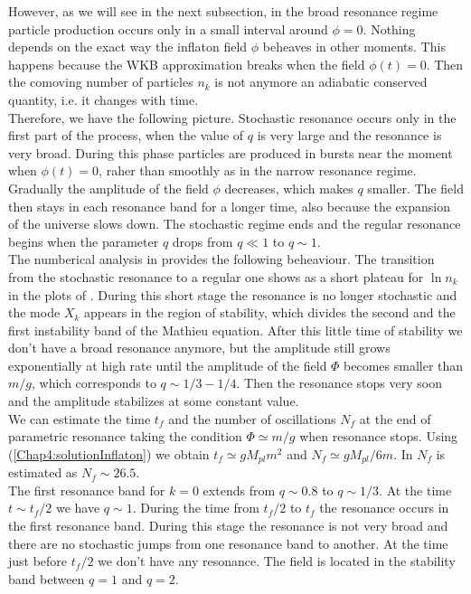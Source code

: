 \documentclass[11pt,a4paper,twoside]{book}
\begin{document}
However, as we will see in the next subsection, in the broad resonance regime particle production occurs only in a small interval around $ \phi=0 $. Nothing depends on the exact way the inflaton field $\phi$ beheaves in other moments. This happens because the WKB approximation breaks when the field $ \phi(t)=0 $. Then the comoving number of particles $ n_{k} $  is not anymore an adiabatic conserved quantity, i.e. it changes with time. \\
Therefore, we have the following picture. Stochastic resonance occurs only in the first part of the process, when the value of  $ q $ is very large and the resonance is very broad.  During this phase particles are produced in bursts near the moment when $ \phi(t)=0 $, raher than smoothly as in the narrow resonance regime. Gradually the amplitude of the field $\phi$ decreases, which makes $ q $ smaller. The field then stays in each resonance band for a longer time, also because the expansion of the universe slows down. The stochastic regime ends and the regular resonance begins when the parameter $ q $ drops from $ q \ll 1 $ to $ q \sim 1 $.\\
 The numberical analysis in \cite{Chap4:LindePreheatingModel} provides the following beheaviour. The transition from the stochastic resonance to a regular one shows as a  short plateau for $ \ln n_{k} $ in the plots of \cite{Chap4:LindePreheatingModel}. During this short stage the resonance is no longer stochastic and the mode $ X_{k} $ appears in the region of stability, which divides the second and the first instability band of the Mathieu equation. After this little time of stability we don't have a broad resonance anymore, but the amplitude still grows exponentially at high rate until the amplitude of the field $ \Phi $ becomes smaller than $ m/g $, which corresponds to $ q \sim 1/3-1/4 $. Then the resonance stops very soon and the amplitude stabilizes at some constant value.\\
We can estimate the time $ t_{f} $ and the number of oscillations $ N_{f} $ at the end of parametric resonance taking the condition $\Phi \simeq m/g$ when resonance stops. Using (\ref{Chap4:solutionInflaton}) we obtain $ t_{f}\simeq gM_{pl}m^{2}$ and $ N_{f}\simeq gM_{pl}/6m $. In \cite{Chap4:LindePreheatingModel} $ N_{f} $ is estimated as $ N_{f} \sim 26.5 $.\\
The first resonance band for $ k=0 $ extends from $ q\sim 0.8 $ to $ q\sim 1/3 $. At the time $ t\sim t_{f}/2 $ we have $ q \sim 1 $. During the time from $ t_{f}/2 $ to $ t_{f} $ the resonance occurs in the first resonance band. During this stage the resonance is not very broad and there are no stochastic jumps from one resonance band to another. At the time just before $ t_{f}/2 $ we don't have any resonance. The field is located in the stability band between $ q=1 $ and $ q=2 $.\\
\end{document}
